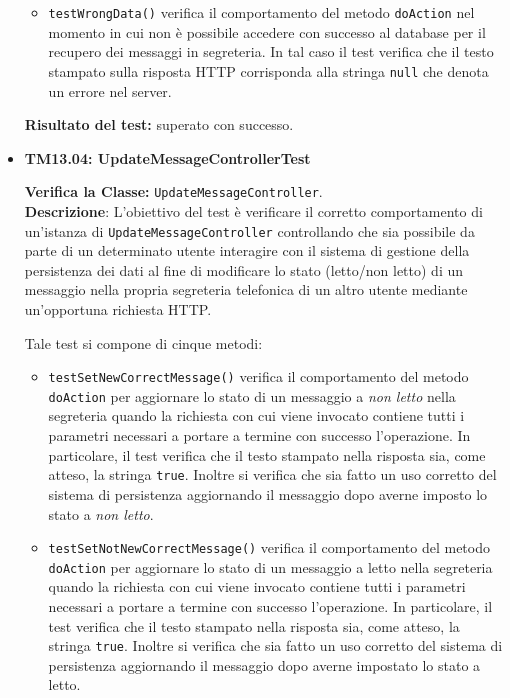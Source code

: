 \begin{itemize}
\begin{itemize}
\item \texttt{testWrongData()} verifica il comportamento del metodo \texttt{doAction} nel momento in cui non è possibile accedere con successo al database per il recupero dei messaggi in segreteria. In tal caso il test verifica che il testo stampato sulla risposta HTTP corrisponda alla stringa \texttt{null} che denota un errore nel server.
\end{itemize}
\textbf{Risultato del test:} superato con successo.


\item \textbf{TM13.04: UpdateMessageControllerTest} 

\textbf{Verifica la Classe:} \texttt{UpdateMessageController}.\\
\textbf{Descrizione}: L'obiettivo del test è verificare il corretto comportamento di un'istanza di \texttt{UpdateMessageController} controllando che sia possibile da parte di un determinato utente interagire con il sistema di gestione della persistenza dei dati al fine di modificare lo stato (letto/non letto) di un messaggio nella propria segreteria telefonica di un altro utente mediante un'opportuna richiesta HTTP\@.

Tale test si compone di cinque metodi:
\begin{itemize}
\item \texttt{testSetNewCorrectMessage()} verifica il comportamento del metodo \texttt{doAction} per aggiornare lo stato di un messaggio a \textit{non letto} nella segreteria quando la richiesta con cui viene invocato contiene tutti i parametri necessari a portare a termine con successo l'operazione. In particolare, il test verifica che il testo stampato nella risposta sia, come atteso, la stringa \texttt{true}. Inoltre si verifica che sia fatto un uso corretto del sistema di persistenza aggiornando il messaggio dopo averne imposto lo stato a \textit{non letto}.

\item \texttt{testSetNotNewCorrectMessage()} verifica il comportamento del metodo \texttt{doAction} per aggiornare lo stato di un messaggio a letto nella segreteria quando la richiesta con cui viene invocato contiene tutti i parametri necessari a portare a termine con successo l'operazione. In particolare, il test verifica che il testo stampato nella risposta sia, come atteso, la stringa \texttt{true}. Inoltre si verifica che sia fatto un uso corretto del sistema di persistenza aggiornando il messaggio dopo averne impostato lo stato a letto.


\end{itemize}
\end{itemize}
